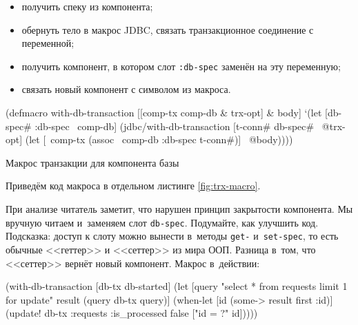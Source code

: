\begin{itemize}

\item
  получить спеку из компонента;

\item
  обернуть тело в макрос JDBC, связать транзакционное соединение с переменной;

\item
  получить компонент, в котором слот \verb|:db-spec| заменён на эту переменную;

\item
  связать новый компонент с символом из макроса.

\end{itemize}

\begin{listing}[ht!]
  \small

\begin{english}
  \begin{clojure}
(defmacro with-db-transaction
  [[comp-tx comp-db & trx-opt] & body]
  `(let [{db-spec# :db-spec} ~comp-db]
     (jdbc/with-db-transaction
       [t-conn# db-spec# ~@trx-opt]
       (let [~comp-tx (assoc ~comp-db :db-spec t-conn#)]
         ~@body))))
  \end{clojure}
\end{english}

\caption{Макрос транзакции для компонента базы}
\label{fig:trx-macro}

\end{listing}


Приведём код макроса в отдельном листинге \ref{fig:trx-macro}.

При анализе читатель заметит, что нарушен принцип закрытости компонента. Мы
вручную читаем и~заменяем слот \verb|db-spec|. Подумайте, как улучшить
код. Подсказка: доступ к слоту можно вынести в~методы \verb|get-|
и~\verb|set-spec|, то есть обычные <<геттер>> и <<сеттер>> из мира ООП. Разница
в~том, что <<сеттер>> вернёт новый компонент. Макрос в~действии:

\begin{english}
  \begin{clojure}
(with-db-transaction
  [db-tx db-started]
  (let [query "select * from requests limit 1 for update"
        result (query db-tx query)]
    (when-let [id (some-> result first :id)]
      (update! db-tx :requests
               {:is_processed false}
               ["id = ?" id]))))
  \end{clojure}
\end{english}

